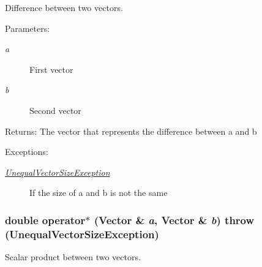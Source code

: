 Difference between two vectors. 

\begin{Desc}
\item[Parameters:]
\begin{description}
\item[{\em a}]First vector \item[{\em b}]Second vector \end{description}
\end{Desc}
\begin{Desc}
\item[Returns:]The vector that represents the difference between a and b \end{Desc}
\begin{Desc}
\item[Exceptions:]
\begin{description}
\item[{\em \hyperlink{classgrassmann_1_1UnequalVectorSizeException}{UnequalVectorSizeException}}]If the size of a and b is not the same \end{description}
\end{Desc}
\hypertarget{classgrassmann_1_1Vector_cd40ad4e72bc86ac3fbf725cf8184d2d}{
\subsubsection[operator$\ast$]{\setlength{\rightskip}{0pt plus 5cm}double operator$\ast$ ({\bf Vector} \& {\em a}, \/  {\bf Vector} \& {\em b})  throw ({\bf UnequalVectorSizeException})}}
\label{classgrassmann_1_1Vector_cd40ad4e72bc86ac3fbf725cf8184d2d}


Scalar product between two vectors. 

